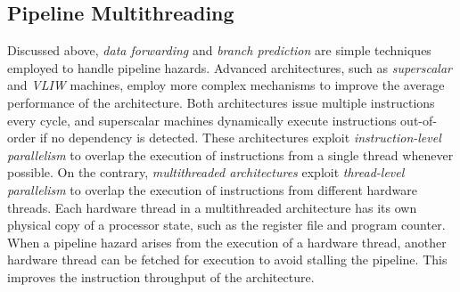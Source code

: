 \subsection{Pipeline Multithreading}
Discussed above, \emph{data forwarding} and \emph{branch prediction} are simple techniques employed to handle pipeline hazards. 
Advanced architectures, such as \emph{superscalar} and \emph{VLIW} machines, employ more complex mechanisms to improve the average performance of the architecture.  
Both architectures issue multiple instructions every cycle, and superscalar machines dynamically execute instructions out-of-order if no dependency is detected.    
These architectures exploit \emph{instruction-level parallelism} to overlap the execution of instructions from a single thread whenever possible.         
On the contrary, \emph{multithreaded architectures} exploit \emph{thread-level parallelism} to overlap the execution of instructions from different hardware threads. 
Each hardware thread in a multithreaded architecture has its own physical copy of a processor state, such as the register file and program counter.
When a pipeline hazard arises from the execution of a hardware thread, another hardware thread can be fetched for execution to avoid stalling the pipeline. 
This improves the instruction throughput of the architecture.


